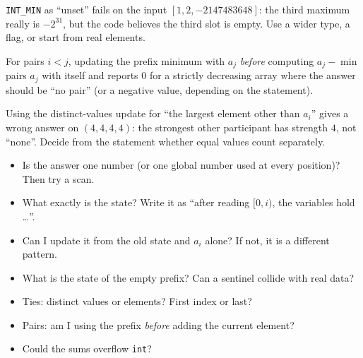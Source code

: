 \begin{warningbox}
\texttt{INT\_MIN} as ``unset'' fails on the input $[1, 2, -2147483648]$: the third maximum really is $-2^{31}$, but the code believes the third slot is empty. Use a wider type, a flag, or start from real elements.
\end{warningbox}

\begin{warningbox}
For pairs $i < j$, updating the prefix minimum with $a_j$ \emph{before} computing $a_j - \min$ pairs $a_j$ with itself and reports $0$ for a strictly decreasing array where the answer should be ``no pair'' (or a negative value, depending on the statement).
\end{warningbox}

\begin{warningbox}
Using the distinct-values update for ``the largest element other than $a_i$'' gives a wrong answer on $(4, 4, 4, 4)$: the strongest other participant has strength $4$, not ``none''. Decide from the statement whether equal values count separately.
\end{warningbox}

\begin{checklistbox}
\begin{itemize}[leftmargin=*]
    \item[$\square$] Is the answer one number (or one global number used at every position)? Then try a scan.
    \item[$\square$] What exactly is the state? Write it as ``after reading $[0, i)$, the variables hold \ldots''.
    \item[$\square$] Can I update it from the old state and $a_i$ alone? If not, it is a different pattern.
    \item[$\square$] What is the state of the empty prefix? Can a sentinel collide with real data?
    \item[$\square$] Ties: distinct values or elements? First index or last?
    \item[$\square$] Pairs: am I using the prefix \emph{before} adding the current element?
    \item[$\square$] Could the sums overflow \texttt{int}?
\end{itemize}
\end{checklistbox}
